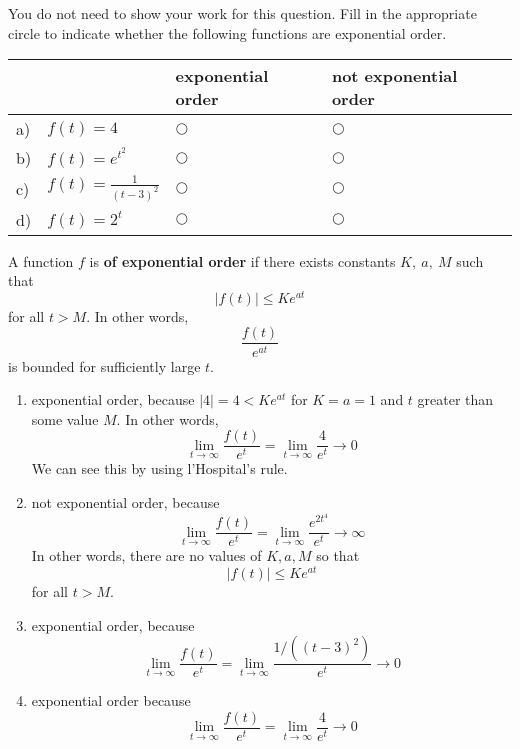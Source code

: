 \ifnum {}
\question[2] You do not need to show your work for this question. Fill in the appropriate circle to indicate whether the following functions are exponential order. 
\vspace{-0.2cm}
\setlength{\extrarowheight}{0.10cm}
\begin{center}
\hspace{-.9cm}\begin{tabular}{ p{0.20cm} p{4cm} p{3.5cm} p{4cm} }
    & & exponential order &  not exponential order  \\[2pt] \hline 
    a) & $f(t) = 4$ & $\bigcirc$  & $\bigcirc$ \\[4pt]  
    b) & $f(t) = e^{t^2}$  & $\bigcirc$  & $\bigcirc$ \\[4pt] 
    c) & $f(t) = \frac{1}{(t-3)^2}$  & $\bigcirc$  & $\bigcirc$ \\[4pt]  
    d) & $f(t) = 2^t$  & $\bigcirc$  & $\bigcirc$ \\[4pt] 
    \hline
\end{tabular}
\end{center}
\setlength{\extrarowheight}{0.0cm}
\ifnum {} {\color{DarkBlue} A function 
$f$ is \textbf{of exponential order} if there exists constants $K, \ a, \ M$ such that $$  |f(t)| \leq Ke^{at}  $$ for all $t > M$. In other words, $$ \frac{f(t)}{e^{at}}  $$ is bounded for sufficiently large $t$.
\begin{enumerate}[label=(\alph*)]
    \item exponential order, because $|4| = 4 < Ke^{at}$ for $K=a=1$ and $t$ greater than some value $M$. In other words, $$\lim_{t\to \infty}\frac{f(t)}{e^t} = \lim_{t\to \infty}\frac{4}{e^t} \to 0$$ We can see this by using l'Hospital's rule. 
    \item not exponential order, because 
    $$\lim_{t\to \infty}\frac{f(t)}{e^t} = \lim_{t\to \infty}\frac{e^{2t^4}}{e^t} \to \infty$$ In other words, there are no values of $K,a,M$ so that $$  |f(t)| \leq Ke^{at}  $$ for all $t > M$.
    \item exponential order, because $$\lim_{t\to \infty}\frac{f(t)}{e^t} = \lim_{t\to \infty}\frac{1/((t-3)^2)}{e^t} \to 0$$    
    \item exponential order because $$\lim_{t\to \infty}\frac{f(t)}{e^t} = \lim_{t\to \infty}\frac{4}{e^t} \to 0$$
\end{enumerate}
}
\fi
\vspace{-6pt} 
\fi 


